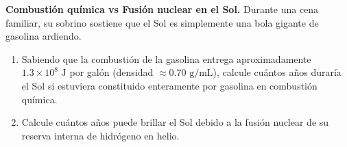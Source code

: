 \item \textbf{Combustión química vs Fusión nuclear en el Sol.}
Durante una cena familiar, su sobrino sostiene que el Sol es simplemente una bola gigante de gasolina ardiendo.
\begin{enumerate}
    \item Sabiendo que la combustión de la gasolina entrega aproximadamente $1.3 \times 10^8\text{ J}$ por galón (densidad $\approx 0.70\text{ g/mL}$), calcule cuántos años duraría el Sol si estuviera constituido enteramente por gasolina en combustión química.
    \item Calcule cuántos años puede brillar el Sol debido a la fusión nuclear de su reserva interna de hidrógeno en helio.
\end{enumerate}